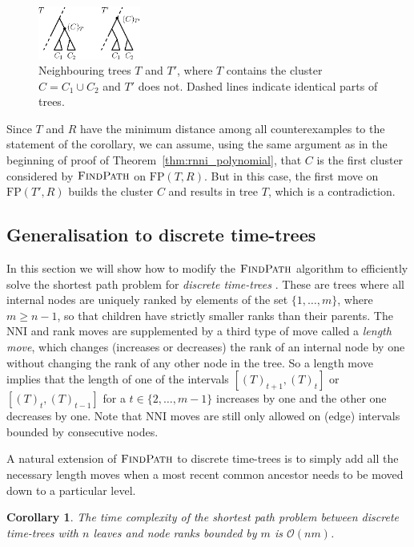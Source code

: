 \documentclass[11pt]{amsart}
\newtheorem{corollary}{Corollary}
\newcommand{\findpath}{\textsc{FindPath}}
\newcommand{\nni}{\mathrm{NNI}}
\newcommand{\fp}{\mathrm{FP}}
\renewcommand{\O}{\mathcal O}
\newcommand{\summary}[1]{} %
\begin{document}
\begin{figure}[ht]
\centering
\includegraphics[width=0.3\textwidth]{cluster_thm_proof}
\caption{Neighbouring trees $T$ and $T'$, where $T$ contains the cluster $C = C_1 \cup C_2$ and $T'$ does not.
Dashed lines indicate identical parts of trees.}
\label{fig:cluster_thm_proof}
\end{figure}

Since $T$ and $R$ have the minimum distance among all counterexamples to the statement of the corollary, we can assume, using the same argument as in the beginning of proof of Theorem~\ref{thm:rnni_polynomial}, that $C$ is the first cluster considered by $\findpath$ on $\fp(T, R)$.
But in this case, the first move on $\fp(T',R)$ builds the cluster $C$ and results in tree $T$, which is a contradiction.
\endproof

\subsection{Generalisation to discrete time-trees}

\summary{Generalising $\findpath$ for discrete time-trees}
In this section we will show how to modify the $\findpath$ algorithm to efficiently solve the shortest path problem for \emph{discrete time-trees} \autocite{Gavryushkin2018-ol}.
These are trees where all internal nodes are uniquely ranked by elements of the set $\{1, \ldots, m\}$, where $m \geq n - 1$, so that children have strictly smaller ranks than their parents.
The NNI and rank moves are supplemented by a third type of move called a \emph{length move}, which changes (increases or decreases) the rank of an internal node by one without changing the rank of any other node in the tree.
So a length move implies that the length of one of the intervals $[(T)_{t+1},(T)_t]$ or $[(T)_t,(T)_{t-1}]$ for a $t \in \{2, \ldots, m-1\}$ increases by one and the other one decreases by one.
Note that $\nni$ moves are still only allowed on (edge) intervals bounded by consecutive nodes.

A natural extension of $\findpath$ to discrete time-trees is to simply add all the necessary length moves when a most recent common ancestor needs to be moved down to a particular level.
\begin{corollary}
The time complexity of the shortest path problem between discrete time-trees with $n$ leaves and node ranks bounded by $m$ is $\O(nm)$.
\label{cor:fp_dtt}
\end{corollary}
\end{document}
